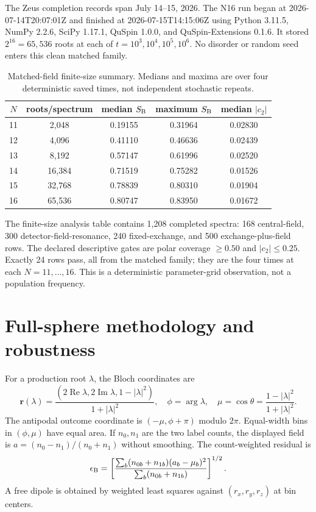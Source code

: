 \documentclass[aps,prl,onecolumn,10pt,notitlepage,superscriptaddress,nofootinbib]{revtex4-2}
\begin{document}
The Zeus completion records span July 14--15, 2026.  The N16 run began at 2026-07-14T20:07:01Z and finished at 2026-07-15T14:15:06Z using Python 3.11.5, NumPy 2.2.6, SciPy 1.17.1, QuSpin 1.0.0, and QuSpin-Extensions 0.1.6.  It stored $2^{16}=65{,}536$ roots at each of $t=10^3,10^4,10^5,10^6$.  No disorder or random seed enters this clean matched family.

\begin{table}[t]
\caption{Matched-field finite-size summary.  Medians and maxima are over four deterministic saved times, not independent stochastic repeats.}
\label{stab:scaling}
\begin{ruledtabular}
\begin{tabular}{ccccc}
$N$ & roots/spectrum & median $S_{\rm B}$ & maximum $S_{\rm B}$ & median $|c_2|$\\
\hline
11 & 2,048  & 0.19155 & 0.31964 & 0.02830\\
12 & 4,096  & 0.41110 & 0.46636 & 0.02439\\
13 & 8,192  & 0.57147 & 0.61996 & 0.02520\\
14 & 16,384 & 0.71519 & 0.75282 & 0.01526\\
15 & 32,768 & 0.78839 & 0.80310 & 0.01904\\
16 & 65,536 & 0.80747 & 0.83950 & 0.01672\\
\end{tabular}
\end{ruledtabular}
\end{table}

The finite-size analysis table contains 1,208 completed spectra: 168 central-field, 300 detector-field-resonance, 240 fixed-exchange, and 500 exchange-plus-field rows.  The declared descriptive gates are polar coverage $\geq0.50$ and $|c_2|\leq0.25$.  Exactly 24 rows pass, all from the matched family; they are the four times at each $N=11,\ldots,16$.  This is a deterministic parameter-grid observation, not a population frequency.

\section{Full-sphere methodology and robustness}

For a production root $\lambda$, the Bloch coordinates are
\begin{equation}
\bm r(\lambda)=\frac{(2\operatorname{Re}\lambda,2\operatorname{Im}\lambda,1-|\lambda|^2)}{1+|\lambda|^2},
\quad \phi=\arg\lambda,\quad\mu=\cos\theta=\frac{1-|\lambda|^2}{1+|\lambda|^2}. \label{seq:bloch}
\end{equation}
The antipodal outcome coordinate is $(-\mu,\phi+\pi)$ modulo $2\pi$.  Equal-width bins in $(\phi,\mu)$ have equal area.  If $n_0,n_1$ are the two label counts, the displayed field is $a=(n_0-n_1)/(n_0+n_1)$ without smoothing.  The count-weighted residual is
\begin{equation}
\epsilon_{\rm B}=\left[\frac{\sum_b(n_{0b}+n_{1b})(a_b-\mu_b)^2}{\sum_b(n_{0b}+n_{1b})}\right]^{1/2}. \label{seq:eps}
\end{equation}
A free dipole is obtained by weighted least squares against $(r_x,r_y,r_z)$ at bin centers.
\end{document}
